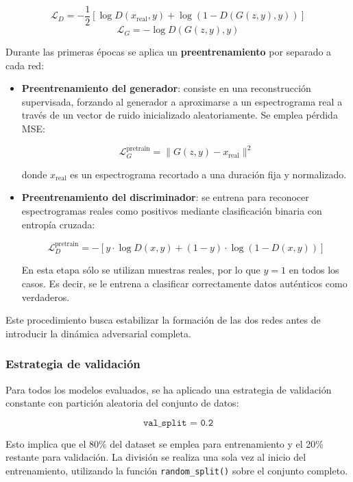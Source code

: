 \[
\mathcal{L}_D = -\frac{1}{2} \left[ \log D(x_{\text{real}}, y) + \log (1 - D(G(z, y), y)) \right]
\]
\[
\mathcal{L}_G = -\log D(G(z, y), y)
\]

\medskip

\noindent Durante las primeras épocas se aplica un \textbf{preentrenamiento} por separado a cada red:

\begin{itemize}
    \item \textbf{Preentrenamiento del generador}: consiste en una reconstrucción supervisada, forzando al generador a aproximarse a un espectrograma real a través de un vector de ruido inicializado aleatoriamente. Se emplea pérdida MSE:
    
    \[
    \mathcal{L}^{\text{pretrain}}_G = \| G(z, y) - x_{\text{real}} \|^2
    \]

    donde $x_{\text{real}}$ es un espectrograma recortado a una duración fija y normalizado.
    
    \item \textbf{Preentrenamiento del discriminador}: se entrena para reconocer espectrogramas reales como positivos mediante clasificación binaria con entropía cruzada:

    \[
    \mathcal{L}^{\text{pretrain}}_D = -\left[ y \cdot \log D(x, y) + (1 - y) \cdot \log(1 - D(x, y)) \right]
    \]

    En esta etapa sólo se utilizan muestras reales, por lo que $y = 1$ en todos los casos. Es decir, se le entrena a clasificar correctamente datos auténticos como verdaderos.
\end{itemize}

Este procedimiento busca estabilizar la formación de las dos redes antes de introducir la dinámica adversarial completa.


\subsubsection*{Estrategia de validación}

Para todos los modelos evaluados, se ha aplicado una estrategia de validación constante con partición aleatoria del conjunto de datos:

\[
\texttt{val\_split = 0.2}
\]

Esto implica que el 80\% del dataset se emplea para entrenamiento y el 20\% restante para validación. La división se realiza una sola vez al inicio del entrenamiento, utilizando la función \texttt{random\_split()} sobre el conjunto completo.

